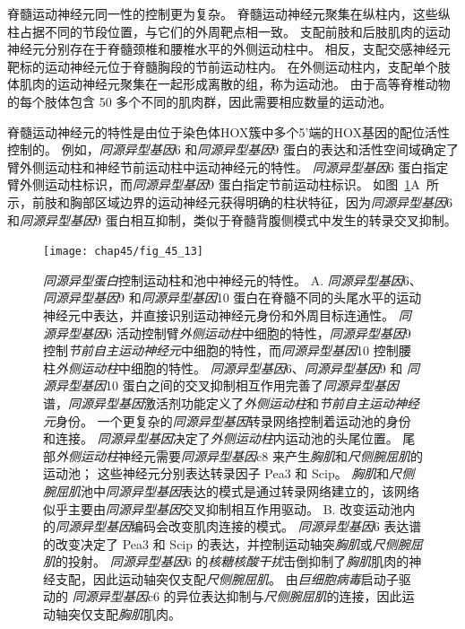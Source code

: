 脊髓运动神经元同一性的控制更为复杂。
脊髓运动神经元聚集在纵柱内，这些纵柱占据不同的节段位置，与它们的外周靶点相一致。
支配前肢和后肢肌肉的运动神经元分别存在于脊髓颈椎和腰椎水平的外侧运动柱中。
相反，支配交感神经元靶标的运动神经元位于脊髓胸段的节前运动柱内。
在外侧运动柱内，支配单个肢体肌肉的运动神经元聚集在一起形成离散的组，称为运动池。
由于高等脊椎动物的每个肢体包含 50 多个不同的肌肉群，因此需要相应数量的运动池。


脊髓运动神经元的特性是由位于染色体HOX簇中多个5'端的HOX基因的配位活性控制的。
例如，\textit{同源异型基因}6 和\textit{同源异型基因}9 蛋白的表达和活性空间域确定了臂外侧运动柱和神经节前运动柱中运动神经元的特性。
\textit{同源异型基因}6 蛋白指定臂外侧运动柱标识，而\textit{同源异型基因}9 蛋白指定节前运动柱标识。
如图~\ref{fig:45_13}A~所示，前肢和胸部区域边界的运动神经元获得明确的柱状特征，因为\textit{同源异型基因}6 和\textit{同源异型基因}9 蛋白相互抑制，类似于脊髓背腹侧模式中发生的转录交叉抑制。


\begin{figure}[htbp]
	\centering
	\texttt{[image: chap45/fig\_45\_13]}
	\caption{\textit{同源异型蛋白}控制运动柱和池中神经元的特性\cite{dasen2005hox}。
		A. \textit{同源异型基因}6、\textit{同源异型基因}9 和\textit{同源异型基因}10 蛋白在脊髓不同的头尾水平的运动神经元中表达，并直接识别运动神经元身份和外周目标连通性。
		\textit{同源异型基因}6 活动控制臂\textit{外侧运动柱}中细胞的特性，\textit{同源异型基因}9 控制\textit{节前自主运动神经元}中细胞的特性，而\textit{同源异型基因}10 控制腰柱\textit{外侧运动柱}中细胞的特性。
		\textit{同源异型基因}6、\textit{同源异型基因}9 和 \textit{同源异型基因}10 蛋白之间的交叉抑制相互作用完善了\textit{同源异型基因}谱，\textit{同源异型基因}激活剂功能定义了\textit{外侧运动柱}和\textit{节前自主运动神经元}身份。
		一个更复杂的\textit{同源异型基因}转录网络控制着运动池的身份和连接。
		\textit{同源异型基因}决定了\textit{外侧运动柱}内运动池的头尾位置。
		尾部\textit{外侧运动柱}神经元需要\textit{同源异型基因}c8 来产生\textit{胸肌}和\textit{尺侧腕屈肌}的运动池；
		这些神经元分别表达转录因子 Pea3 和 Scip。
		\textit{胸肌}和\textit{尺侧腕屈肌}池中\textit{同源异型基因}表达的模式是通过转录网络建立的，该网络似乎主要由\textit{同源异型基因}交叉抑制相互作用驱动。
		B. 改变运动池内的\textit{同源异型基因}编码会改变肌肉连接的模式。
		\textit{同源异型基因}6 表达谱的改变决定了 Pea3 和 Scip 的表达，并控制运动轴突\textit{胸肌}或\textit{尺侧腕屈肌}的投射。
		\textit{同源异型基因}6 的\textit{核糖核酸干扰}击倒抑制了\textit{胸肌}肌肉的神经支配，因此运动轴突仅支配\textit{尺侧腕屈肌}。
		由\textit{巨细胞病毒}启动子驱动的 \textit{同源异型基因}c6 的异位表达抑制与\textit{尺侧腕屈肌}的连接，因此运动轴突仅支配\textit{胸肌}肌肉。}
	\label{fig:45_13}
\end{figure}




